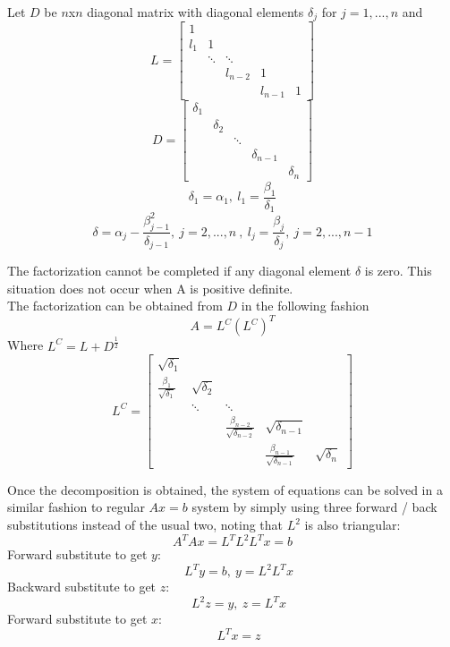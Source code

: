 \documentclass[12pt]{article}
\begin{document}
Let $D$ be $n$x$n$ diagonal matrix with diagonal elements $\delta_j$ for $j = 1,...,n$ and
$$
L= \left[
\begin{array}{ccccc}
1 &  &  & & \\
l_1 & 1 &   & & \\
  &\ddots&\ddots& &  \\
 &  & l_{n-2} & 1 &  \\
  &  &   & l_{n-1} & 1
\end{array}
\right]
$$
$$
D= \left[
\begin{array}{ccccc}
\delta_1 &  &  & & \\
 & \delta_2 &   & & \\
  & &\ddots& &  \\
 &  &  & \delta_{n-1} &  \\
  &  &   &  & \delta_n
\end{array}
\right]
$$
$$\delta_1=\alpha_1, \ l_1=\frac{\beta_1}{\delta_1}$$
$$\delta=\alpha_j-\frac{\beta_{j-1}^2}{\delta_{j-1}},\ j=2,...,n\ ,\ l_j=\frac{\beta_j}{\delta_j},\ j=2,...,n-1$$

The factorization cannot be completed if any diagonal element $\delta$ is zero. This situation does not occur when A is positive definite.\\

The factorization can be obtained from $D$ in the following fashion
$$
A = L^C(L^C)^T
$$
Where $L^C=L+D^{\frac{1}{2}}$
$$
L^C = \left[
\begin{array}{ccccc}
\sqrt{\delta_1} &  &  & & \\
\frac{\beta_1}{\sqrt{\delta_1}} & \sqrt{\delta_2} &   & & \\
  &\ddots&\ddots& &  \\
 &  & \frac{\beta_{n-2}}{\sqrt{\delta_{n-2}}} & \sqrt{\delta_{n-1}} &  \\
  &  &   & \frac{\beta_{n-1}}{\sqrt{\delta_{n-1}}} & \sqrt{\delta_n}
\end{array}
\right]
$$

Once the decomposition is obtained, the system of equations can be solved in a similar fashion to regular $Ax=b$ system by simply using three forward / back substitutions instead of the usual two, noting that $L^2$ is also triangular:
$$A^T A x = L^T L^2 L^T x = b$$
Forward substitute to get $y$:$$\quad  L^T y = b,\ y = L^2 L^T x$$
Backward substitute to get $z$:$$\quad  L^2 z = y, \ z = L^T x$$
Forward substitute to get $x$:$$\quad  L^T x = z$$
\end{document}
